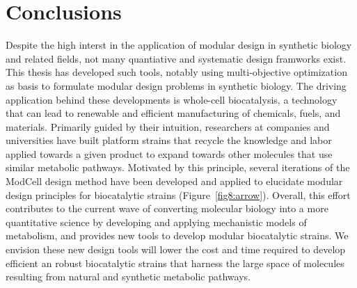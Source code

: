 \chapter{Conclusions} \label{ch:conclusion}




Despite the high interst in the application of modular design in synthetic biology and related fields,
not many quantiative and systematic design framworks exist.
This thesis has developed such tools, notably using multi-objective optimization as basis to formulate modular design problems in synthetic biology.
The driving application behind these developments is whole-cell biocatalysis, a technology that can lead to renewable and efficient manufacturing of chemicals, fuels, and materials.
Primarily guided by their intuition, researchers at companies and universities have built platform strains that recycle the knowledge and labor applied towards a given product to expand towards other molecules that use similar metabolic pathways. %
Motivated by this principle, several iterations of the ModCell design method have been developed and applied to elucidate modular design principles for biocatalytic strains (Figure~\ref{fig8:arrow}).
Overall, this effort contributes to the current wave of converting molecular biology into a more quantitative science by developing and applying mechanistic models of metabolism, and provides new tools to develop modular biocatalytic strains.
We envision these new design tools will lower the cost and time required to develop efficient an robust biocatalytic strains that harness the large space of molecules resulting from natural and synthetic metabolic pathways.

